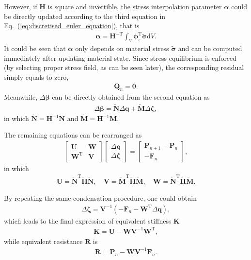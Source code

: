 \documentclass[3p,sort&compress,review,11pt]{elsarticle}
\newcommand*{\md}[1]{\mathrm{d}#1}
\newcommand*{\mT}{\mathrm{T}}
\newcommand*{\eqsref}[1]{Eq.~(\ref{#1})}
\newcommand*{\mb}{\bm}
\begin{document}
However, if $\mb{H}$ is square and invertible, the stress interpolation parameter $\mb{\alpha}$ could be directly updated according to the third equation in \eqsref{eq:discretised_euler_equation}, that is
\begin{gather}\label{eq:answer_alpha}
\mb{\alpha}=\mb{H}^{-\mT}\int_V\mb{\phi}_\varepsilon^\mT\tilde{\mb{\sigma}}\md{V}.
\end{gather}
It could be seen that $\mb{\alpha}$ only depends on material stress $\tilde{\mb{\sigma}}$ and can be computed immediately after updating material state. Since stress equilibrium is enforced (by selecting proper stress field, as can be seen later), the corresponding residual simply equals to zero,
\begin{gather*}
\mb{Q}_n=\mb{0}.
\end{gather*}
Meanwhile, $\Delta\mb{\beta}$ can be directly obtained from the second equation as
\begin{gather}\label{eq:answer_beta}
\Delta\mb{\beta}=\tilde{\mb{N}}\Delta\mb{q}+\tilde{\mb{M}}\Delta\mb{\zeta},
\end{gather}
in which $\tilde{\mb{N}}=\mb{H}^{-1}\mb{N}$ and $\tilde{\mb{M}}=\mb{H}^{-1}\mb{M}$.

The remaining equations can be rearranged as
\begin{gather*}
\begin{bmatrix}
\mb{U}&\mb{W}\\\mb{W}^\mT&\mb{V}
\end{bmatrix}
\begin{bmatrix}
\Delta\mb{q}\\\Delta\mb{\zeta}
\end{bmatrix}=
\begin{bmatrix}
\mb{P}_{n+1}-\mb{P}_n\\-\mb{F}_n
\end{bmatrix},
\end{gather*}
in which
\begin{gather}\label{eq:answer_uvw}
\mb{U}=\tilde{\mb{N}}^\mT\tilde{\mb{H}}\tilde{\mb{N}},\quad
\mb{V}=\tilde{\mb{M}}^\mT\tilde{\mb{H}}\tilde{\mb{M}},\quad
\mb{W}=\tilde{\mb{N}}^\mT\tilde{\mb{H}}\tilde{\mb{M}}.
\end{gather}

By repeating the same condensation procedure, one could obtain
\begin{gather}\label{eq:answer_zeta}
\Delta\mb{\zeta}=\mb{V}^{-1}\left(-\mb{F}_n-\mb{W}^\mT\Delta\mb{q}\right),
\end{gather}
which leads to the final expression of equivalent stiffness $\mb{K}$
\begin{gather}\label{eq:answer_stiffness}
\mb{K}=\mb{U}-\mb{W}\mb{V}^{-1}\mb{W}^\mT,
\end{gather}
while equivalent resistance $\mb{R}$ is
\begin{gather}\label{eq:answer_resistance}
\mb{R}=\mb{P}_n-\mb{W}\mb{V}^{-1}\mb{F}_n.
\end{gather}
\end{document}
